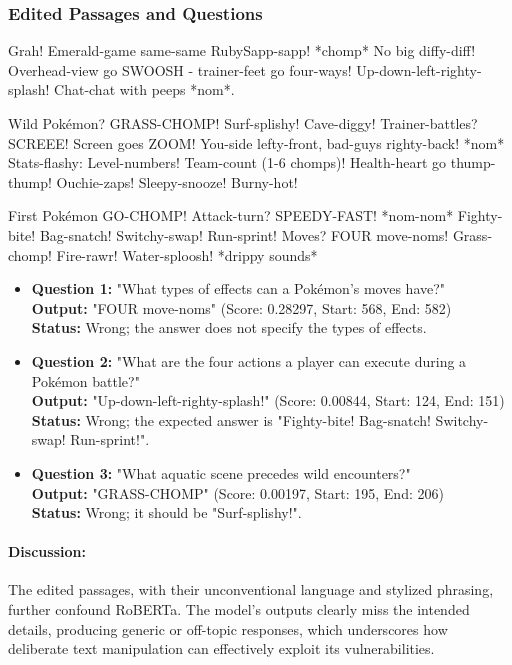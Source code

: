 \documentclass[11pt]{article}
\begin{document}
\subsubsection{Edited Passages and Questions}
\begin{mdframed}
Grah! Emerald-game same-same RubySapp-sapp! *chomp* No big diffy-diff! Overhead-view go SWOOSH - trainer-feet go four-ways! Up-down-left-righty-splash! Chat-chat with peeps *nom*.

Wild Pokémon? GRASS-CHOMP! Surf-splishy! Cave-diggy! Trainer-battles? SCREEE! Screen goes ZOOM! You-side lefty-front, bad-guys righty-back! *nom* Stats-flashy: Level-numbers! Team-count (1-6 chomps)! Health-heart go thump-thump! Ouchie-zaps! Sleepy-snooze! Burny-hot!

First Pokémon GO-CHOMP! Attack-turn? SPEEDY-FAST! *nom-nom* Fighty-bite! Bag-snatch! Switchy-swap! Run-sprint! Moves? FOUR move-noms! Grass-chomp! Fire-rawr! Water-sploosh! *drippy sounds*
\end{mdframed}
\begin{itemize}
    \item \textbf{Question 1:} "What types of effects can a Pokémon's moves have?" \\
          \textbf{Output:} "FOUR move-noms" (Score: 0.28297, Start: 568, End: 582) \\
          \textbf{Status:} Wrong; the answer does not specify the types of effects.
    \item \textbf{Question 2:} "What are the four actions a player can execute during a Pokémon battle?" \\
          \textbf{Output:} "Up-down-left-righty-splash!" (Score: 0.00844, Start: 124, End: 151) \\
          \textbf{Status:} Wrong; the expected answer is "Fighty-bite! Bag-snatch! Switchy-swap! Run-sprint!".
    \item \textbf{Question 3:} "What aquatic scene precedes wild encounters?" \\
          \textbf{Output:} "GRASS-CHOMP" (Score: 0.00197, Start: 195, End: 206) \\
          \textbf{Status:} Wrong; it should be "Surf-splishy!".
\end{itemize}
\paragraph{Discussion:} The edited passages, with their unconventional language and stylized phrasing, further confound RoBERTa. The model's outputs clearly miss the intended details, producing generic or off-topic responses, which underscores how deliberate text manipulation can effectively exploit its vulnerabilities.
\end{document}
